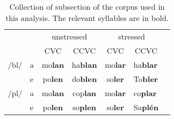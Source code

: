 \begin{table}[]
    \centering
    \begin{tabular}{ll|cc|cl|l}
    \cline{3-6}
                               &   & \multicolumn{2}{c|}{unstressed}     & \multicolumn{2}{c|}{stressed}                          &  \\ \cline{3-6}
                               &   & \multicolumn{1}{c|}{CVC}   & CCVC   & \multicolumn{1}{c|}{CVC}   & \multicolumn{1}{c|}{CCVC} &  \\ \cline{1-6}
    \multicolumn{1}{|l|}{/bl/} & a & \multicolumn{1}{c|}{mo\textbf{lan}} & ha\textbf{blan} & \multicolumn{1}{c|}{mo\textbf{lar}} & ha\textbf{blar}                    &  \\ \cline{2-6}
    \multicolumn{1}{|l|}{}     & e & \multicolumn{1}{c|}{po\textbf{len}} & do\textbf{blen} & \multicolumn{1}{c|}{so\textbf{ler}} & To\textbf{bler}                    &  \\ \cline{1-6}
    \multicolumn{1}{|l|}{/pl/} & a & \multicolumn{1}{c|}{mo\textbf{lan}} & cop\textbf{lan} & \multicolumn{1}{c|}{mo\textbf{lar}} & co\textbf{plar}                    &  \\ \cline{2-6}
    \multicolumn{1}{|l|}{}     & e & \multicolumn{1}{c|}{po\textbf{len}} & so\textbf{plen} & \multicolumn{1}{c|}{so\textbf{ler}} & Sa\textbf{plén}                    &  \\ \cline{1-6}
    \end{tabular}%
    \caption{Collection of subsection of the corpus used in this analysis. The relevant syllables are in bold.}
    \label{tab:corpus}
    \end{table}